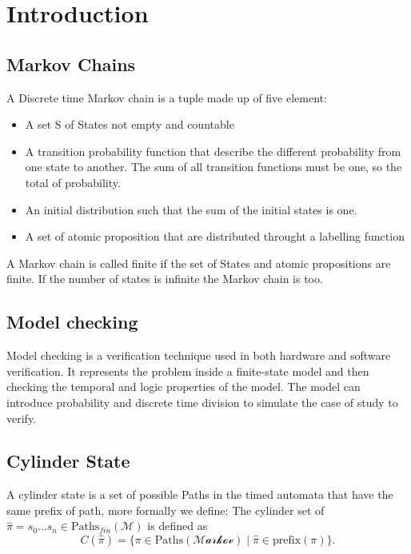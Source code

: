 \chapter*{Introduction}
	\section {Markov Chains}
	A Discrete time Markov chain is a tuple made up of five element: 
	\begin{itemize}
		\item A set S of States not empty and countable 
		\item A transition probability function that describe the different probability from one state to another. The sum of all transition functions must be one, so the total of probability. 
		\item An initial distribution such that the sum of the initial states is one.
		\item A set of atomic proposition that are distributed throught a labelling function 
	\end{itemize}
	A Markov chain is called finite if the set of States and atomic propositions are finite. If the number of states is infinite the Markov chain is too. 
	
	\section{Model checking}
	Model checking is a verification technique used in both hardware and software verification. It represents the problem inside a finite-state model and then checking the temporal and logic properties of the model. The model can introduce probability and discrete time division to simulate the case of study to verify. 
	\section{Cylinder State}
	A cylinder state is a set of possible Paths in the timed automata that have the same prefix of path, more formally we define: 
	The cylinder set of $\widehat{\pi} = s_0 \dots s_n \in \text{Paths}_{fin}(\mathcal{M})$ is defined as
	\[
	C(\widehat{\pi}) = \{ \pi \in \text{Paths}(\mathcal{Markov}) \mid \widehat{\pi} \in \text{prefix}(\pi) \}.
	\] 

